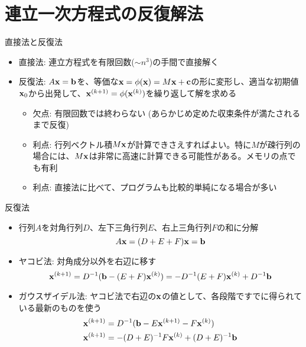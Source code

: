 \section{連立一次方程式の反復解法}

\begin{frame}[t,fragile]{直接法と反復法}
  \begin{itemize}
  \item 直接法: 連立方程式を有限回数($\sim n^3$)の手間で直接解く
  \item 反復法: $A{\bf x}={\bf b}$を、等価な${\bf x} = \phi({\bf x}) = M{\bf x} + {\bf c}$の形に変形し、適当な初期値${\bf x}_0$から出発して、${\bf x}^{(k+1)} = \phi({\bf x}^{(k)})$を繰り返して解を求める
    \begin{itemize}
    \item 欠点: 有限回数では終わらない (あらかじめ定めた収束条件が満たされるまで反復)
    \item 利点: 行列ベクトル積$M{\bf x}$が計算できさえすればよい。特に$M$が疎行列の場合には、$M{\bf x}$は非常に高速に計算できる可能性がある。メモリの点でも有利
    \item 利点: 直接法に比べて、プログラムも比較的単純になる場合が多い
    \end{itemize}
  \end{itemize}
\end{frame}

\begin{frame}[t,fragile]{反復法}
  \begin{itemize}
  \item 行列$A$を対角行列$D$、左下三角行列$E$、右上三角行列$F$の和に分解
    \[
    A{\bf x} = (D + E + F){\bf x} = {\bf b}
    \]
  \item ヤコビ法: 対角成分以外を右辺に移す
    \[
      {\bf x}^{(k+1)} = D^{-1} ({\bf b} - (E+F) {\bf x}^{(k)}) = -D^{-1}(E+F){\bf x}^{(k)} + D^{-1} {\bf b}
      \]
    \item ガウスザイデル法: ヤコビ法で右辺の${\bf x}$の値として、各段階ですでに得られている最新のものを使う
    \begin{align*}
      {\bf x}^{(k+1)} &= D^{-1} ({\bf b} - E{\bf x}^{(k+1)} - F{\bf x}^{(k)}) \\
      {\bf x}^{(k+1)} &= -(D+E)^{-1} F{\bf x}^{(k)} + (D+E)^{-1}{\bf b}
    \end{align*}
  \end{itemize}
\end{frame}

